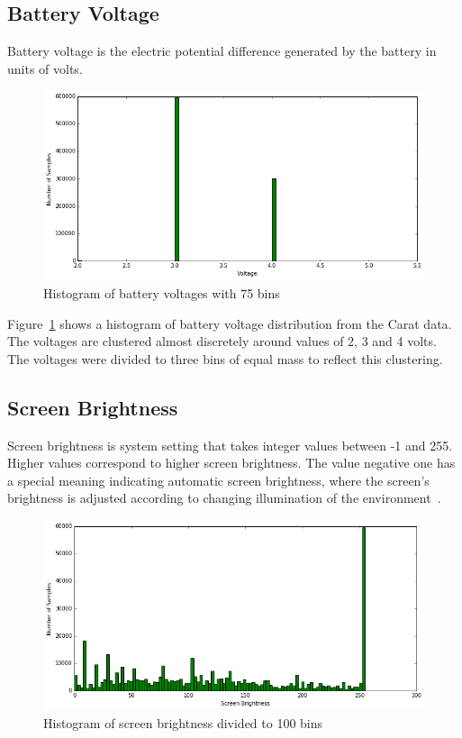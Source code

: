 \subsection{Battery Voltage}  

Battery voltage is the electric potential difference generated by the battery in units of volts.

\begin{figure} %
	\centering
	\includegraphics[width=\textwidth]{images/carat-data/battery_voltage.png}
	\caption{Histogram of battery voltages with 75 bins}
	\label{figure:carat-data-battery-voltage}
\end{figure}  

Figure~\ref{figure:carat-data-battery-voltage} shows a histogram of battery voltage distribution from the Carat data. The voltages are clustered almost discretely around values of 2, 3 and 4 volts. The voltages were divided to three bins of equal mass to reflect this clustering.    

\subsection{Screen Brightness} \label{carat data screen}

Screen brightness is system setting that takes integer values between -1 and 255. Higher values correspond to higher screen brightness. The value negative one has a special meaning indicating automatic screen brightness, where the screen's brightness is adjusted according to changing illumination of the environment~\cite{PELTONEN201671}.

\begin{figure} %
	\centering
	\includegraphics[width=\textwidth]{images/carat-data/screen_brightness.png}
	\caption{Histogram of screen brightness divided to 100 bins}
	\label{figure:carat-data-screen-brightness}
\end{figure}    

